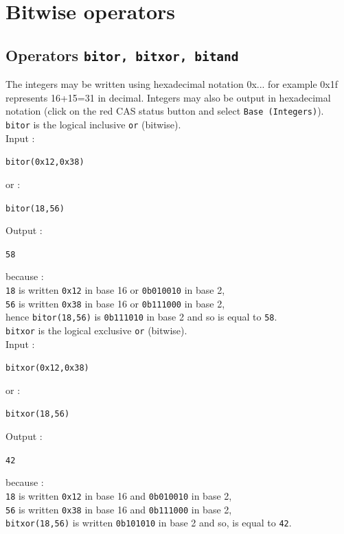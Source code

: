 \documentclass[a4paper,11pt]{book}
\begin{document}
\section{Bitwise operators}
\subsection{Operators {\tt bitor, bitxor, bitand}}
The integers may be written using hexadecimal notation 0x...
for example 0x1f represents 16+15=31 in decimal. 
Integers may also be output in hexadecimal notation 
(click on the red CAS status button and select {\tt Base (Integers)}).\\
{\tt bitor} is the logical inclusive {\tt or} (bitwise).\\
Input :
\begin{center}{\tt bitor(0x12,0x38)}\end{center}
or :
\begin{center}{\tt bitor(18,56)}\end{center}
Output :
\begin{center}{\tt 58}\end{center}
because :\\
{\tt 18} is written {\tt 0x12} in base 16 or {\tt 0b010010} in base 2,\\
{\tt 56} is written {\tt 0x38} in base 16 or {\tt 0b111000} in base 2,\\
hence {\tt bitor(18,56)} is {\tt 0b111010} in base 2 and so is equal to 
{\tt 58}.\\

{\tt bitxor} is the logical exclusive {\tt or} (bitwise).\\
Input :
\begin{center}{\tt bitxor(0x12,0x38)}\end{center}
or :
\begin{center}{\tt bitxor(18,56)}\end{center}
Output :
\begin{center}{\tt 42}\end{center}
because :\\
{\tt 18} is written {\tt 0x12} in base 16 and {\tt 0b010010} in base 2,\\
{\tt 56} is written {\tt 0x38} in base 16 and {\tt 0b111000} in base 2,\\
{\tt bitxor(18,56)} is written {\tt 0b101010} in base 2 and so, is equal to 
{\tt 42}.\\
\end{document}
